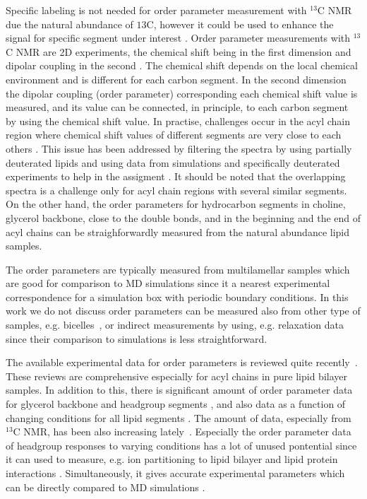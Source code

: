 \documentclass[aps,prl,superscriptaddress,twocolumn]{revtex4}
\begin{document}
Specific labeling is not needed for order parameter measurement with $^{13}$C NMR due the 
natural abundance of $ {13}$C, however it could be used to enhance the signal for specific 
segment under interest \cite{??}. Order parameter measurements with $^{13}$C NMR are
2D experiments, the chemical shift being in the first dimension and dipolar coupling 
in the second \cite{??}. The chemical shift depends on the local chemical environment and 
is different for each carbon segment. In the second dimension the dipolar coupling
(order parameter) corresponding each chemical shift value is measured, and its value 
can be connected, in principle, to each carbon segment by using the chemical shift value.  
In practise, challenges occur in the acyl chain region where chemical shift values 
of different segments are very close to each others \cite{??}. This issue has been
addressed by filtering the spectra by using partially deuterated lipids \cite{ferreira13}
and using data from simulations and specifically deuterated experiments to help in 
the assigment \cite{ferreira13,??}. It should be noted that the overlapping spectra 
is a challenge only for acyl chain regions with several similar segments. On the other hand, 
the order parameters for hydrocarbon segments in choline, glycerol backbone, close to the 
double bonds, and in the beginning and the end of acyl chains can be straighforwardly 
measured from the natural abundance lipid samples. 

The order parameters are typically measured from multilamellar samples which are good for comparison to MD 
simulations since it a nearest experimental correspondence for a simulation box with periodic boundary conditions. 
In this work we do not discuss order parameters can be measured also from other type of samples, 
e.g. bicelles~\cite{aussenac03,raffard00,sanders92}, or indirect measurements by using, e.g. relaxation
data~\cite{??} since their comparison to simulations is less straightforward.  

The available experimental data for order parameters is reviewed
quite recently~\cite{leftin11,marsh13}. These reviews are comprehensive especially for 
acyl chains in pure lipid bilayer samples. In addition to this, there is significant
amount of order parameter data for glycerol backbone and headgroup segments \cite{botan15}, and
also data as a function of changing conditions for all lipid segments \cite{??}.
The amount of data, especially from $^{13}$C NMR, has been also increasing lately~\cite{ferreira13,leftin??,??}.
Especially the order parameter data of headgroup responses to varying conditions 
has a lot of unused pontential since it can used to measure, e.g. ion partitioning to lipid
bilayer \cite{??,ionpaper} and lipid protein interactions \cite{??}. Simultaneously, it
gives accurate experimental parameters which can be directly compared to MD simulations \cite{botan15,iopaper}.
\end{document}
